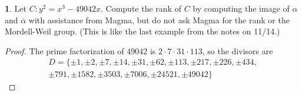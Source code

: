 \documentclass[12pt]{article}
\theoremstyle{definition}
\newtheorem{ex}{}
\begin{document}
\begin{ex}
	Let $C : y^{2} = x^{3} - 49042x$. Compute the rank of $C$ by computing
	the image of $\alpha$ and $\overline{\alpha}$ with assistance from Magma,
	but do not ask Magma for the rank or the Mordell-Weil group. (This is like
	the last example from the notes on 11/14.)
\end{ex}
\begin{proof}
	The prime factorization of $49042$ is $2 \cdot 7 \cdot 31 \cdot 113$, so the divisors are \begin{align*}
		D = \lbrace \pm 1, \pm 2, \pm 7, \pm 14, \pm 31, \pm 62, \pm 113, \pm 217, \pm 226, \pm 434, \\
		\pm 791, \pm 1582, \pm 3503, \pm 7006, \pm 24521, \pm 49042 \rbrace
	\end{align*}


\end{proof}
\end{document}
